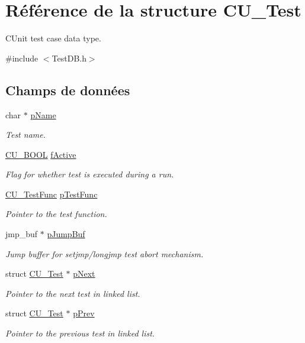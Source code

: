 \hypertarget{structCU__Test}{\section{Référence de la structure C\-U\-\_\-\-Test}
\label{structCU__Test}
}


C\-Unit test case data type.  




{\ttfamily \#include $<$Test\-D\-B.\-h$>$}

\subsection*{Champs de données}
\begin{DoxyCompactItemize}
\item 
char $\ast$ \hyperlink{structCU__Test_ae1f688f9e108805d7f59ee364c5eb2a2}{p\-Name}
\begin{DoxyCompactList}\small\item\em Test name. \end{DoxyCompactList}\item 
\hyperlink{group__Framework_gabd98d449e979a6379b06551242106dd4}{C\-U\-\_\-\-B\-O\-O\-L} \hyperlink{structCU__Test_acd22f634d3a52462f0e2843d80383f08}{f\-Active}
\begin{DoxyCompactList}\small\item\em Flag for whether test is executed during a run. \end{DoxyCompactList}\item 
\hyperlink{group__Framework_ga5868148b642b30635b8fe7f095c5b493}{C\-U\-\_\-\-Test\-Func} \hyperlink{structCU__Test_a9543ec07c51ec70a40cdd845ce3bf55b}{p\-Test\-Func}
\begin{DoxyCompactList}\small\item\em Pointer to the test function. \end{DoxyCompactList}\item 
jmp\-\_\-buf $\ast$ \hyperlink{structCU__Test_ada5212c6bacdbaf9319968d895a69ce4}{p\-Jump\-Buf}
\begin{DoxyCompactList}\small\item\em Jump buffer for setjmp/longjmp test abort mechanism. \end{DoxyCompactList}\item 
struct \hyperlink{structCU__Test}{C\-U\-\_\-\-Test} $\ast$ \hyperlink{structCU__Test_abca70319a9ee946094bd7de3e3207141}{p\-Next}
\begin{DoxyCompactList}\small\item\em Pointer to the next test in linked list. \end{DoxyCompactList}\item 
struct \hyperlink{structCU__Test}{C\-U\-\_\-\-Test} $\ast$ \hyperlink{structCU__Test_a1b0ae6d72f43397547a0ff3680001c24}{p\-Prev}
\begin{DoxyCompactList}\small\item\em Pointer to the previous test in linked list. \end{DoxyCompactList}\end{DoxyCompactItemize}


